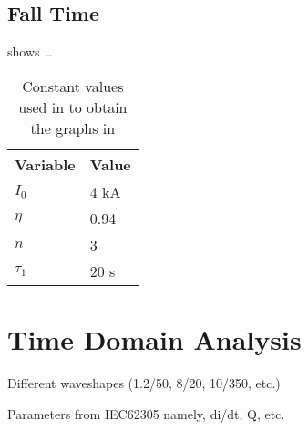 \subsection{Fall Time}
\label{sub:fall_time}

 shows \ldots 
{}
\begin{table}[htbp]
	\centering
	\caption{Constant values used in  to obtain the graphs in }
	\begin{tabular}{ll}
		\textbf{Variable} & \textbf{Value} \\
		\hline
		$I_0$ & 4 kA \\
		$\eta$ & 0.94 \\
		$n$ & 3 \\
		$\tau_1$ & 20 \micro s
	\end{tabular}
	\label{tab:TFConstsFall}
\end{table}




\section{Time Domain Analysis}
\label{sec:time_domain_analysis}

Different waveshapes (1.2/50, 8/20, 10/350, etc.)

Parameters from IEC62305 namely, di/dt, Q, etc.



